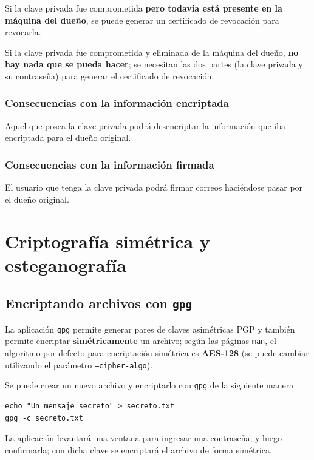 Si la clave privada fue comprometida \textbf{pero todavía está presente en la máquina del dueño}, se puede generar un certificado de revocación para revocarla.

Si la clave privada fue comprometida y eliminada de la máquina del dueño, \textbf{no hay nada que se pueda hacer}; se necesitan las dos partes (la clave privada y su contraseña) para generar el certificado de revocación. 

\subsubsection{Consecuencias con la información encriptada}

Aquel que posea la clave privada podrá desencriptar la información que iba encriptada para el dueño original.

\subsubsection{Consecuencias con la información firmada}

El usuario que tenga la clave privada podrá firmar correos haciéndose pasar por el dueño original.



\section{Criptografía simétrica y esteganografía}

\subsection{Encriptando archivos con \texttt{gpg}}

La aplicación \texttt{gpg} permite generar pares de claves asimétricas PGP y también permite encriptar \textbf{simétricamente} un archivo; según las páginas \texttt{man}, el algoritmo por defecto para encriptación simétrica es  \textbf{AES-128} (se puede cambiar utilizando el parámetro \texttt{--cipher-algo}).   

Se puede crear un nuevo archivo y encriptarlo con \texttt{gpg} de la siguiente manera

\begin{lstlisting}
echo "Un mensaje secreto" > secreto.txt
gpg -c secreto.txt
\end{lstlisting}

La aplicación levantará una ventana para ingresar una contraseña, y luego confirmarla; con dicha clave se encriptará el archivo de forma simétrica.

